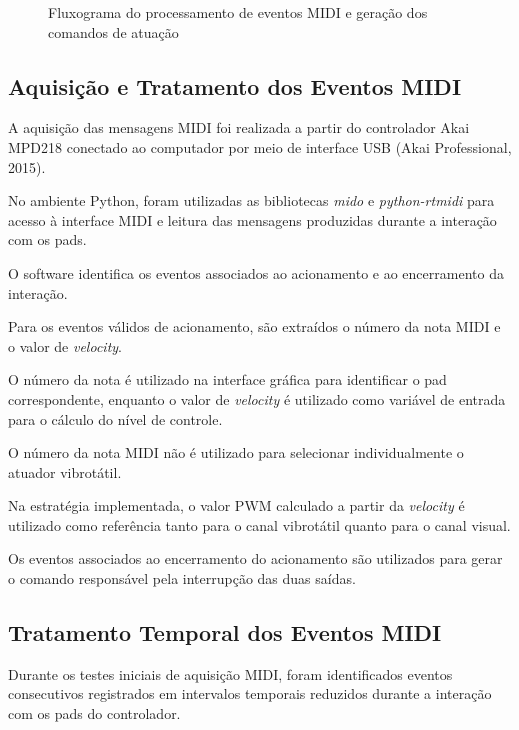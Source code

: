 \begin{figure}[!htbp]
\centering
\resizebox{0.95\linewidth}{!}{}
\caption{Fluxograma do processamento de eventos MIDI e geração dos comandos de atuação}
\label{fig:fluxograma_algoritmo}
\end{figure}

\subsection{Aquisição e Tratamento dos Eventos MIDI}
\label{sec:aquisicao_midi}

A aquisição das mensagens MIDI foi realizada a partir do controlador Akai MPD218 conectado ao computador por meio de interface USB (Akai Professional, 2015).

No ambiente Python, foram utilizadas as bibliotecas \textit{mido} e \textit{python-rtmidi} para acesso à interface MIDI e leitura das mensagens produzidas durante a interação com os pads.

O software identifica os eventos associados ao acionamento e ao encerramento da interação.

Para os eventos válidos de acionamento, são extraídos o número da nota MIDI e o valor de \textit{velocity}.

O número da nota é utilizado na interface gráfica para identificar o pad correspondente, enquanto o valor de \textit{velocity} é utilizado como variável de entrada para o cálculo do nível de controle.

O número da nota MIDI não é utilizado para selecionar individualmente o atuador vibrotátil.

Na estratégia implementada, o valor PWM calculado a partir da \textit{velocity} é utilizado como referência tanto para o canal vibrotátil quanto para o canal visual.

Os eventos associados ao encerramento do acionamento são utilizados para gerar o comando responsável pela interrupção das duas saídas.

\subsection{Tratamento Temporal dos Eventos MIDI}
\label{sec:debounce_midi}

Durante os testes iniciais de aquisição MIDI, foram identificados eventos consecutivos registrados em intervalos temporais reduzidos durante a interação com os pads do controlador.


